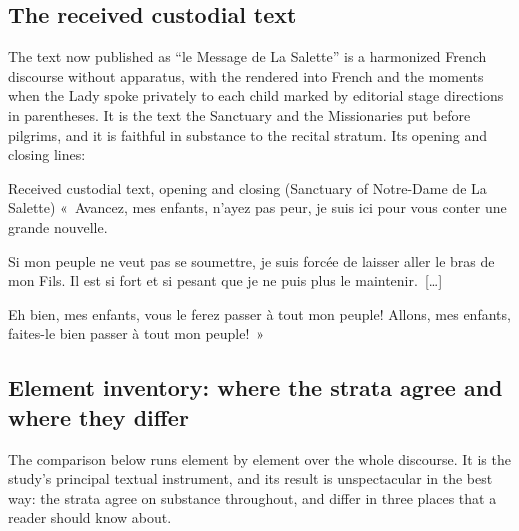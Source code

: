 \subsection{The received custodial text}

The text now published as ``le Message de La Salette'' is a
harmonized French discourse without apparatus, with the
 rendered into French and the moments when the Lady
spoke privately to each child marked by editorial stage directions
in parentheses. It is the text the Sanctuary and the Missionaries
put before pilgrims, and it is faithful in substance to the recital
stratum. Its opening and closing lines:

\begin{witnesstext}{Received custodial text, opening and closing
(Sanctuary of Notre-Dame de La Salette)}
«~Avancez, mes enfants, n'ayez pas peur, je suis ici pour vous
conter une grande nouvelle.\par
Si mon peuple ne veut pas se soumettre, je suis forcée de laisser
aller le bras de mon Fils. Il est si fort et si pesant que je ne
puis plus le maintenir.~[\ldots]\par
Eh bien, mes enfants, vous le ferez passer à tout mon peuple!
Allons, mes enfants, faites-le bien passer à tout mon
peuple!~»
\end{witnesstext}

\subsection{Element inventory: where the strata agree and where they
differ}

The comparison below runs element by element over the whole
discourse. It is the study's principal textual instrument, and its
result is unspectacular in the best way: the strata agree on
substance throughout, and differ in three places that a reader
should know about.

